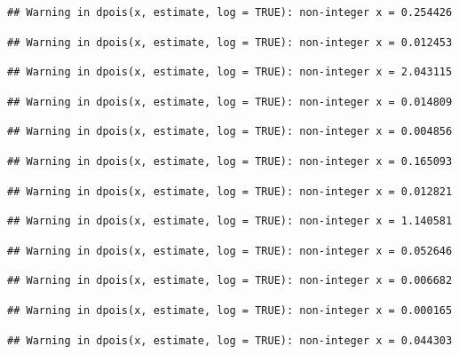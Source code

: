 \documentclass[]{article}
\begin{document}
\begin{verbatim}
## Warning in dpois(x, estimate, log = TRUE): non-integer x = 0.254426
\end{verbatim}

\begin{verbatim}
## Warning in dpois(x, estimate, log = TRUE): non-integer x = 0.012453
\end{verbatim}

\begin{verbatim}
## Warning in dpois(x, estimate, log = TRUE): non-integer x = 2.043115
\end{verbatim}

\begin{verbatim}
## Warning in dpois(x, estimate, log = TRUE): non-integer x = 0.014809
\end{verbatim}

\begin{verbatim}
## Warning in dpois(x, estimate, log = TRUE): non-integer x = 0.004856
\end{verbatim}

\begin{verbatim}
## Warning in dpois(x, estimate, log = TRUE): non-integer x = 0.165093
\end{verbatim}

\begin{verbatim}
## Warning in dpois(x, estimate, log = TRUE): non-integer x = 0.012821
\end{verbatim}

\begin{verbatim}
## Warning in dpois(x, estimate, log = TRUE): non-integer x = 1.140581
\end{verbatim}

\begin{verbatim}
## Warning in dpois(x, estimate, log = TRUE): non-integer x = 0.052646
\end{verbatim}

\begin{verbatim}
## Warning in dpois(x, estimate, log = TRUE): non-integer x = 0.006682
\end{verbatim}

\begin{verbatim}
## Warning in dpois(x, estimate, log = TRUE): non-integer x = 0.000165
\end{verbatim}

\begin{verbatim}
## Warning in dpois(x, estimate, log = TRUE): non-integer x = 0.044303
\end{verbatim}
\end{document}
